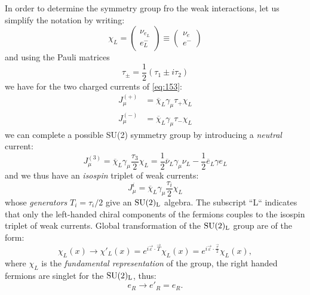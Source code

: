 In order to determine the symmetry group fro the weak interactions, let us
simplify the notation by writing:
\begin{equation}
  \chi_L =
  \begin{pmatrix}
    \nu_{e_L} \\ e^-_L
  \end{pmatrix}
  \equiv
  \begin{pmatrix}
    \nu_e \\ e^-
  \end{pmatrix}
\end{equation}
and using the Pauli matrices
\begin{equation}
  \tau_\pm = \frac{1}{2}( \tau_1 \pm i \tau_2)
\end{equation}
we have for the two charged currents of \cref{eq:153}:
\begin{equation}
  \begin{split}
    J_\mu^{(+)} &= \overbar{\chi}_L \gamma_\mu \tau_+ \chi_L \\
    J_\mu^{(-)} &= \overbar{\chi}_L \gamma_\mu \tau_- \chi_L
  \end{split}
\end{equation}
we can complete a possible SU(2) symmetry group by introducing a \emph{neutral}
current:
\begin{equation}
  J_\mu^{(3)} = \overbar{\chi}_L \gamma_\mu \frac{\tau_3}{2} \chi_L = \frac{1}{2}
  \overbar{\nu}_L \gamma_\mu \nu_L - \frac{1}{2} \overbar{e}_L \gamma
  e_L
  \label{eq:161}
\end{equation}
and we thus have an \emph{isospin} triplet of weak currents:
\begin{equation}
  \label{eq:1}
  J_\mu^i = \overbar{\chi}_L \gamma_\mu \frac{\tau_i}{2} \chi_L
\end{equation}
whose \emph{generators} $T_i = \tau_i / 2$ give an $\mathrm{SU}(2)_\mathrm{L}$ algebra. The
subscript ``L`` indicates that only the left-handed chiral components of the
fermions couples to the isospin triplet of weak currents. Global transformation
of the $\mathrm{SU}(2)_\mathrm{L}$ group are of the form:
\begin{equation}
  \chi_L (x) \to \chi'_L (x) = e^{i \vec{\varepsilon} \cdotp \vec{T}} \chi_L(x)
  = e^{i \vec{\varepsilon} \cdotp \frac{\vec{\tau}}{2}} \chi_L(x),
\end{equation}
where $\chi_L$ is the \emph{fundamental representation} of the group, the right
handed fermions are singlet for the $\mathrm{SU}(2)_\mathrm{L}$, thus:
\begin{equation}
  e_{R} \to e'_{R}= e_{R}.
\end{equation}
